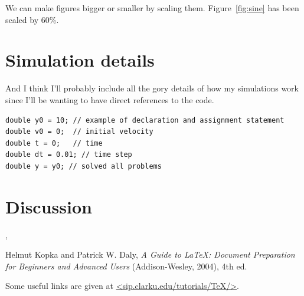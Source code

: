 \documentclass[prb,11pt]{revtex4-1}
\begin{document}
We can make figures bigger or smaller by scaling them. Figure~\ref{fig:sine}
has been scaled by 60\%.


\section{Simulation details}
And I think I'll probably include all the gory details of how my simulations work since I'll be wanting to have direct references to the code. 
\begin{verbatim}
double y0 = 10; // example of declaration and assignment statement
double v0 = 0;  // initial velocity
double t = 0;   // time
double dt = 0.01; // time step
double y = y0; // solved all problems
\end{verbatim}


\section{Discussion}

{\color{blue}{Finally I wax philosophical}},
{\color{green}{but}} {\color{cyan}{who is going pay for the ink?}}

\begin{thebibliography}{5}

Helmut Kopka and Patrick W. Daly, \textsl{A Guide to
\LaTeX: Document Preparation for Beginners and Advanced Users} (Addison-Wesley, 2004), 4th ed.

Some useful links are
given at \url{<sip.clarku.edu/tutorials/TeX/>}.

\end{thebibliography}
\end{document}

